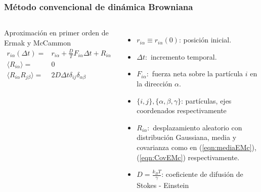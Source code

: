 
\begin{frame}
  \frametitle{Método convencional de  dinámica Browniana}
  \begin{columns}
     \begin{exampleblock}{Aproximación en primer orden de Ermak y McCammon}
     \begin{align}
        r_{i\alpha}(\Delta t)=&r_{i\alpha}+\frac{D}{T}F_{i\alpha}\Delta t+R_{i\alpha}\\
        \langle R_{i\alpha}\rangle=&0 \label{eqn:mediaEMc}\\
        \langle R_{i\alpha} R_{j\beta}\rangle=&2D\Delta t \delta_{ij}\delta_{\alpha\beta}\label{eqn:CovEMc}
     \end{align}
    \end{exampleblock}
     \begin{itemize}
      \item $r_{i\alpha}\equiv r_{i\alpha}(0)$: posición inicial.
      \item $\Delta t:$ incremento temporal.
      \item $F_{i\alpha}:$ fuerza neta sobre la partícula $i$ en la dirección $\alpha$.
      \item $\{i,j\},\{\alpha,\beta,\gamma\}$: partículas, ejes coordenados respectivamente
      \item $R_{i\alpha}:$ desplazamiento aleatorio con distribución Gaussiana,  media y covarianza
     como en (\ref{eqn:mediaEMc}),(\ref{eqn:CovEMc}) respectivamente.
      \item $D=\frac{k_B T}{\gamma}$: coeficiente de difusión de Stokes - Einstein
    \end{itemize}
   \end{columns}
\end{frame}
